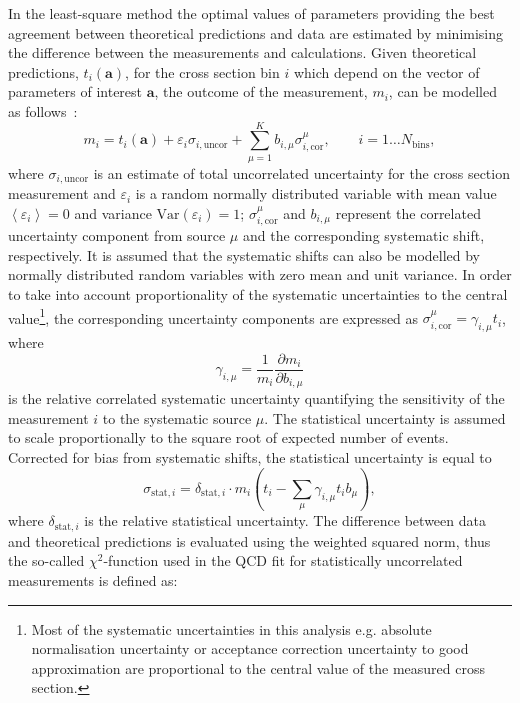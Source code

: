 In the least-square method the optimal values of parameters providing the best agreement between theoretical predictions and data are estimated by minimising the difference between the measurements and calculations. Given theoretical predictions, $t_i\left( \mathbf{a} \right)$, for the cross section bin $i$ which depend on the vector of parameters of interest $\mathbf{a}$, the outcome of the measurement, $m_i$, can be modelled as follows~\cite{Stump:2001gu,Botje:2001fx}:
\begin{equation}
 m_i = t_i\left( \mathbf{a} \right) + \varepsilon_{i} \sigma_{i,\text{uncor}} + \sum_{\mu=1}^{K}{b_{i,\mu}\sigma_{i,\text{cor}}^\mu}, \qquad i=1\ldots N_\text{bins},
\end{equation}
where $\sigma_{i,\text{uncor}}$ is an estimate of total uncorrelated uncertainty for the cross section measurement and $\varepsilon_{i}$ is a random normally distributed variable with mean value $\left\langle \varepsilon_{i}\right\rangle = 0$ and variance $\text{Var}\left( \varepsilon_{i}\right) = 1$; $\sigma_{i,\text{cor}}^\mu$ and $b_{i,\mu}$ represent the correlated uncertainty component from source $\mu$ and the corresponding systematic shift, respectively. It is assumed that the systematic shifts can also be modelled by normally distributed random variables with zero mean and unit variance. In order to take into account proportionality of the systematic uncertainties to the central value\footnote{Most of the systematic uncertainties in this analysis e.g. absolute normalisation uncertainty or acceptance correction uncertainty to good approximation are proportional to the central value of the measured cross section.}, the corresponding uncertainty components are expressed as $\sigma_{i,\text{cor}}^\mu = \gamma_{i,\mu}t_i$, where 
\begin{equation}
\gamma_{i,\mu}=\frac{1}{{m_i}} \frac{\partial m_i}{\partial b_{i,\mu}}
\end{equation}
is the relative correlated systematic uncertainty quantifying the sensitivity of the measurement $i$ to the systematic source $\mu$. The statistical uncertainty is assumed to scale proportionally to the square root of expected number of events. Corrected for bias from systematic shifts, the statistical uncertainty is equal to
\begin{equation}
 \sigma_{\text{stat},i} = \delta_{\text{stat},i}\cdot m_i\left( t_i - \sum_\mu\gamma_{i,\mu}t_ib_\mu \right),
\end{equation}
where $\delta_{\text{stat},i}$ is the relative statistical uncertainty. The difference between data and theoretical predictions is evaluated using the weighted squared norm, thus the so-called $\chi^2$-function used in the QCD fit  for statistically uncorrelated measurements is defined as:
